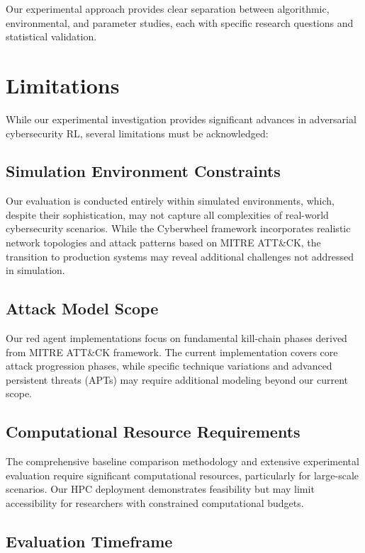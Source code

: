 \documentclass[12pt,twoside]{article}
\newcounter{phase}[algorithm]
\theoremstyle{definition}
\theoremstyle{plain}
\begin{document}
Our experimental approach provides clear separation between algorithmic, environmental, and parameter studies, each with specific research questions and statistical validation.

\section{Limitations}

While our experimental investigation provides significant advances in adversarial cybersecurity RL, several limitations must be acknowledged:

\subsection{Simulation Environment Constraints}

Our evaluation is conducted entirely within simulated environments, which, despite their sophistication, may not capture all complexities of real-world cybersecurity scenarios. While the Cyberwheel framework incorporates realistic network topologies and attack patterns based on MITRE ATT\&CK, the transition to production systems may reveal additional challenges not addressed in simulation.

\subsection{Attack Model Scope}

Our red agent implementations focus on fundamental kill-chain phases derived from MITRE ATT\&CK framework. The current implementation covers core attack progression phases, while specific technique variations and advanced persistent threats (APTs) may require additional modeling beyond our current scope.

\subsection{Computational Resource Requirements}

The comprehensive baseline comparison methodology and extensive experimental evaluation require significant computational resources, particularly for large-scale scenarios. Our HPC deployment demonstrates feasibility but may limit accessibility for researchers with constrained computational budgets.

\subsection{Evaluation Timeframe}
\end{document}
